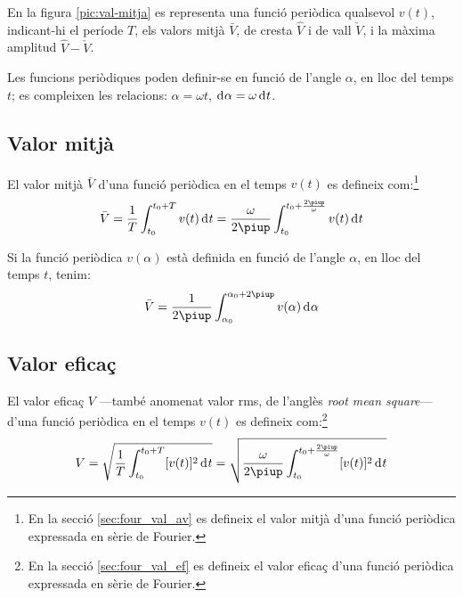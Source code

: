 En la figura \vref{pic:val-mitja} es representa una funció periòdica qualsevol $v(t)$, indicant-hi el període $T$, els valors mitjà $\bar{V}$, de cresta $\hat{V}$ i de vall $\check{V}$, i la màxima amplitud  $\hat{V}-\check{V}$.
\begin{center}
    
    \label{pic:val-mitja}
\end{center}

Les funcions periòdiques poden  definir-se en funció de l'angle $\alpha$, en lloc del temps $t$; es compleixen les relacions:
$\alpha=\omega t$, $\diff\alpha=\omega\diff t$.

\subsection{Valor mitjà}

El valor mitjà $\bar{V}$ d'una funció
periòdica en el temps $v(t)$ es
defineix com:\footnote{En la secció \ref{sec:four_val_av} es defineix el valor mitjà d'una funció periòdica expressada en sèrie de Fourier.}
\begin{equation}
    \bar{V} = \frac{1}{T} \int_{t_0}^{t_0+T} v(t) \diff t =
    \frac{\omega}{2\piup} \int_{t_0}^{t_0+\frac{2\piup}{\omega}} v(t) \diff t\label{eq:vm_t}
\end{equation}

Si la funció periòdica $v(\alpha)$ està definida en funció de
l'angle $\alpha$, en lloc del temps $t$, tenim:
\begin{equation}
    \bar{V} = \frac{1}{2\piup} \int_{\alpha_0}^{\alpha_0+2\piup} v(\alpha) \diff \alpha
    \label{eq:vm_alfa}
\end{equation}

\subsection{Valor eficaç}

El valor eficaç  $V$ ---també anomenat valor rms, de l'anglès \textit{root mean square}--- d'una funció periòdica en el temps $v(t)$ es defineix com:\footnote{En la secció \ref{sec:four_val_ef} es defineix el valor eficaç d'una funció periòdica expressada en sèrie de Fourier.}
\begin{equation}
    V = \sqrt{\frac{1}{T} \int_{t_0}^{t_0+T} [v(t)]^2 \diff
    t} = \sqrt{\frac{\omega}{2\piup} \int_{t_0}^{t_0+\frac{2\piup}{\omega}}
     [v(t)]^2 \diff t}
\end{equation}

